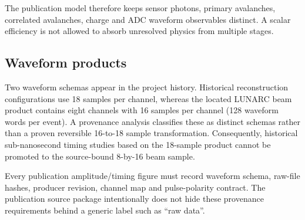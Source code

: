 The publication model therefore keeps sensor photons, primary avalanches, correlated avalanches, charge and ADC waveform observables distinct. A scalar efficiency is not allowed to absorb unresolved physics from multiple stages.

\subsection{Waveform products}

Two waveform schemas appear in the project history. Historical reconstruction configurations use 18 samples per channel, whereas the located LUNARC beam product contains eight channels with 16 samples per channel (128 waveform words per event). A provenance analysis classifies these as distinct schemas rather than a proven reversible 16-to-18 sample transformation. Consequently, historical sub-nanosecond timing studies based on the 18-sample product cannot be promoted to the source-bound 8-by-16 beam sample.

Every publication amplitude/timing figure must record waveform schema, raw-file hashes, producer revision, channel map and pulse-polarity contract. The publication source package intentionally does not hide these provenance requirements behind a generic label such as ``raw data''.
